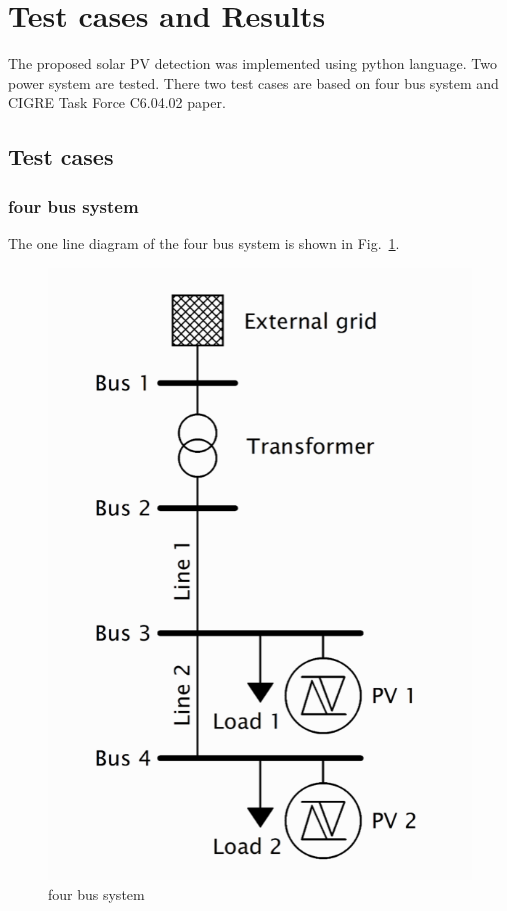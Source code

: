 \section{Test cases and Results}
The proposed solar PV detection was implemented using python language.
Two power system are tested. There two test cases are based on four bus system and CIGRE Task Force C6.04.02 paper\cite{b3}.

\subsection{Test cases}

\subsubsection{four bus system}
The one line diagram of the four bus system is shown in Fig.~\ref{fig.4_bus_system}.
\begin{figure}[h!]
  \center
  \includegraphics[scale=0.25]{images/four_bus_system.png}
  \caption{four bus system}
  \label{fig.4_bus_system}
\end{figure}

